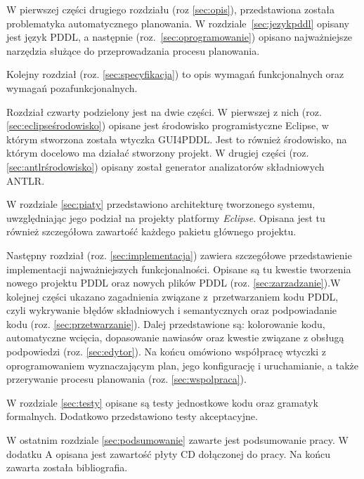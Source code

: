 W pierwszej części drugiego rozdziału (roz \ref{sec:opis}), przedstawiona została problematyka automatycznego planowania. W rozdziale~\ref{sec:jezykpddl} opisany jest język PDDL, a następnie (roz.~\ref{sec:oprogramowanie}) opisano najważniejsze narzędzia służące do przeprowadzania procesu planowania.

Kolejny rozdział (roz. \ref{sec:specyfikacja}) to opis wymagań funkcjonalnych oraz wymagań pozafunkcjonalnych.

Rozdział czwarty podzielony jest na dwie części. W pierwszej z nich (roz. \ref{sec:eclipseśrodowisko})  opisane jest środowisko programistyczne Eclipse, w którym stworzona została wtyczka GUI4PDDL. Jest to również środowisko, na którym docelowo ma działać stworzony projekt. W drugiej części (roz. \ref{sec:antlrśrodowisko}) opisany został generator analizatorów składniowych ANTLR.

W rozdziale \ref{sec:piaty} przedstawiono architekturę tworzonego systemu, uwzględniając jego podział na projekty platformy \emph{Eclipse}. Opisana jest tu również szczegółowa zawartość każdego pakietu głównego projektu.

Następny rozdział (roz. \ref{sec:implementacja}) zawiera szczegółowe przedstawienie implementacji najważniejszych funkcjonalności. Opisane są tu kwestie tworzenia nowego projektu PDDL oraz nowych plików PDDL (roz. \ref{sec:zarzadzanie}).W kolejnej części ukazano zagadnienia związane z~przetwarzaniem kodu PDDL, czyli wykrywanie błędów składniowych i semantycznych oraz podpowiadanie kodu (roz. \ref{sec:przetwarzanie}). Dalej przedstawione są: kolorowanie kodu, automatyczne wcięcia, dopasowanie nawiasów oraz kwestie związane z obsługą podpowiedzi (roz. \ref{sec:edytor}).  Na końcu omówiono współpracę wtyczki z oprogramowaniem wyznaczającym plan, jego konfigurację i uruchamianie, a także przerywanie procesu planowania (roz. \ref{sec:wspolpraca}).

W rozdziale \ref{sec:testy} opisane są testy jednostkowe kodu oraz gramatyk formalnych. Dodatkowo przedstawiono testy akceptacyjne.

W ostatnim rozdziale \ref{sec:podsumowanie} zawarte jest podsumowanie pracy. W dodatku A opisana jest zawartość płyty CD dołączonej do pracy. Na końcu zawarta została bibliografia.
